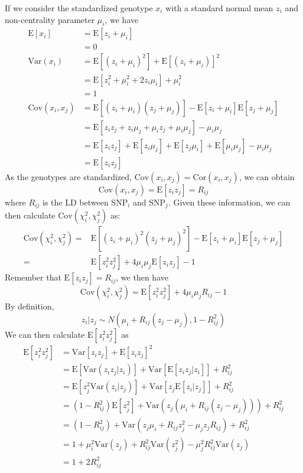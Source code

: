 \documentclass[12pt]{scrbook}
\begin{document}
If we consider the standardized genotype $x_i$ with a standard normal mean $z_i$ and non-centrality parameter $\mu_i$, we have
\begin{align*}
\mathrm{E}[x_i]&=\mathrm{E}[z_i+\mu_i]\\
&=0\\
\mathrm{Var}(x_i) &=\mathrm{E}[(z_i+\mu_i)^2]+\mathrm{E}[(z_i+\mu_i)]^2\\
&=\mathrm{E}[z_i^2+\mu_i^2+2z_i\mu_i]+\mu_i^2\\
&=1 \\
\mathrm{Cov}(x_i,x_j)&=\mathrm{E}[(z_i+\mu_i)(z_j+\mu_j)]-\mathrm{E}[z_i+\mu_i]\mathrm{E}[z_j+\mu_j]\\
&=\mathrm{E}[z_iz_j+z_i\mu_j+\mu_iz_j+\mu_i\mu_j]-\mu_i\mu_j\\
&=\mathrm{E}[z_iz_j]+\mathrm{E}[z_i\mu_j]+\mathrm{E}[z_j\mu_i]+\mathrm{E}[\mu_i\mu_j]-\mu_i\mu_j\\
&=\mathrm{E}[z_iz_j]
\end{align*}
As the genotypes are standardized, $\mathrm{Cov}(x_i,x_j)=\mathrm{Cor}(x_i,x_j)$, we can obtain
$$
\mathrm{Cov}(x_i,x_j)=\mathrm{E}[z_iz_j]=R_{ij}
$$
where $R_{ij}$ is the \gls{LD} between \gls{SNP}$_i$ and \gls{SNP}$_j$.
Given these information, we can then calculate $\mathrm{Cov}(\chi_i^2,\chi_j^2)$ as:
\begin{align*}
\mathrm{Cov}(\chi_i^2,\chi_j^2)=&\mathrm{E}[(z_i+\mu_i)^2(z_j+\mu_j)^2]-\mathrm{E}[z_i+\mu_i]\mathrm{E}[z_j+\mu_j]\\
=&\mathrm{E}[z_i^2z_j^2]+4\mu_i\mu_j\mathrm{E}[z_iz_j]-1
\end{align*}
Remember that $\mathrm{E}[z_iz_j] = R_{ij}$, we then have
$$
\mathrm{Cov}(\chi_i^2, \chi_j^2)=\mathrm{E}[z_i^2z_j^2]+4\mu_i\mu_jR_{ij}-1
$$
By definition, 
$$
z_i|z_j\sim N(\mu_i+R_{ij}(z_j-\mu_j),1-R_{ij}^2)
$$
We can then calculate $\mathrm{E}[z_i^2z_j^2]$ as
\begin{align*}
\mathrm{E}[z_i^2z_j^2]&=\mathrm{Var}[z_iz_j]+\mathrm{E}[z_iz_j]^2\\
&=\mathrm{E}[\mathrm{Var}(z_iz_j|z_i)]+\mathrm{Var}[\mathrm{E}[z_iz_j|z_i]]+R_{ij}^2\\
&=\mathrm{E}[z_j^2\mathrm{Var}(z_i|z_j)]+\mathrm{Var}[z_j\mathrm{E}[z_i|z_j]]+R_{ij}^2\\
&=(1-R_{ij}^2)\mathrm{E}[z_j^2]+\mathrm{Var}(z_j(\mu_i+R_{ij}(z_j-\mu_j)))+R_{ij}^2\\
&=(1-R_{ij}^2)+\mathrm{Var}(z_j\mu_i+R_{ij}z_j^2-\mu_jz_jR_{ij})+R_{ij}^2\\
&=1+\mu_i^2\mathrm{Var}(z_j)+R_{ij}^2\mathrm{Var}(z_j^2)-\mu_j^2R_{ij}^2\mathrm{Var}(z_j)\\
&=1+2R_{ij}^2
\end{align*}
\end{document}
